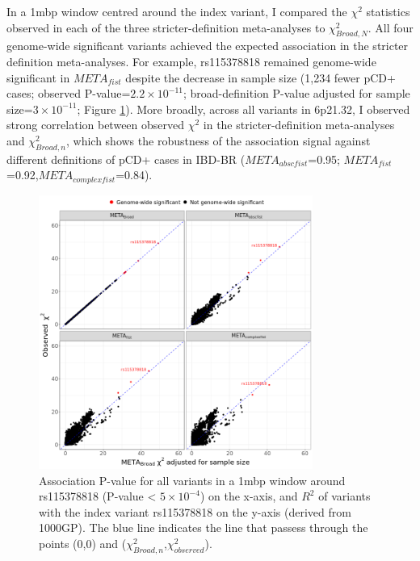 In a 1mbp window centred around the index variant, I compared the $\chi^{2}$ statistics observed in each of the three stricter-definition meta-analyses to $\chi^{2}_{Broad,N}$. All four genome-wide significant variants achieved the expected association in the stricter definition meta-analyses. For example, rs115378818 remained genome-wide significant in $META_{fist}$ despite the decrease in sample size (1,234 fewer pCD+ cases; observed P-value=$2.2\times10^{-11}$; broad-definition P-value adjusted for sample size=$3\times10^{-11}$; Figure \ref{fig:meta_def_comparison}). More broadly, across all variants in 6p21.32, I observed strong correlation between observed $\chi^{2}$ in the stricter-definition meta-analyses and $\chi^{2}_{Broad,n}$, which shows the robustness of the association signal against different definitions of pCD+ cases in IBD-BR ($META_{abscfist}$=0.95; $META_{fist}$=0.92,$META_{complexfist}$=0.84). 

\begin{figure}[H] 
  \centering    
  \includegraphics[width=0.8\textwidth]{Vector/meta_chisq_plot}
  \caption[$\chi^{2}$ of genome-wide significant SNPs with different pCD definitions]{Association P-value for all variants in a 1mbp window around rs115378818 (P-value < $5\times10^{-4}$) on the x-axis, and $R^{2}$ of variants with the index variant rs115378818 on the y-axis (derived from 1000GP). The blue line indicates the line that passess through the points (0,0) and ($\chi^{2}_{Broad,n}$,$\chi^{2}_{observed}$).}
  \label{fig:meta_def_comparison}
  \end{figure}
